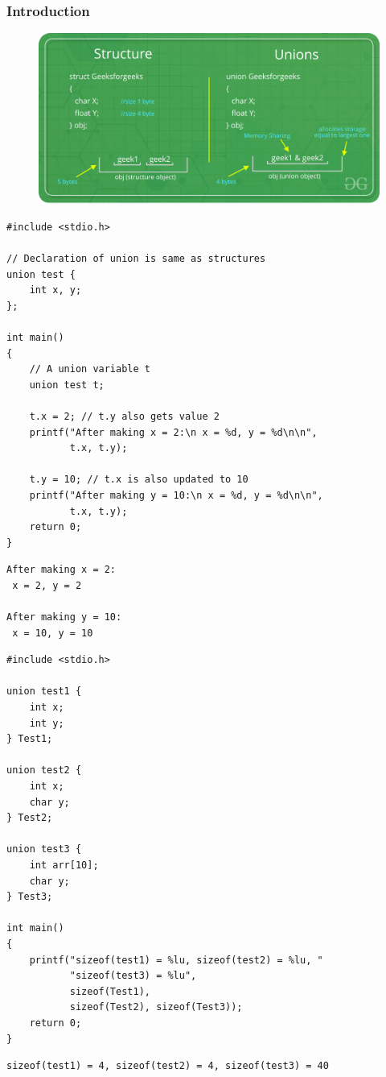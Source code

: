 \documentclass{../c-lecture}
\begin{document}
\begin{frame}
  \frametitle{Introduction}
  \begin{figure}
  \includegraphics[width=\textwidth]{./img/union.png}
  \end{figure}
\end{frame}

\begin{frame}[fragile]
  \begin{verbatim}
#include <stdio.h>

// Declaration of union is same as structures
union test {
    int x, y;
};

int main()
{
    // A union variable t
    union test t;

    t.x = 2; // t.y also gets value 2
    printf("After making x = 2:\n x = %d, y = %d\n\n",
           t.x, t.y);

    t.y = 10; // t.x is also updated to 10
    printf("After making y = 10:\n x = %d, y = %d\n\n",
           t.x, t.y);
    return 0;
}
  \end{verbatim}
  \begin{verbatim}
After making x = 2:
 x = 2, y = 2

After making y = 10:
 x = 10, y = 10
  \end{verbatim}
\end{frame}

\begin{frame}[fragile]
  \begin{verbatim}
#include <stdio.h>

union test1 {
    int x;
    int y;
} Test1;

union test2 {
    int x;
    char y;
} Test2;

union test3 {
    int arr[10];
    char y;
} Test3;

int main()
{
    printf("sizeof(test1) = %lu, sizeof(test2) = %lu, "
           "sizeof(test3) = %lu",
           sizeof(Test1),
           sizeof(Test2), sizeof(Test3));
    return 0;
}
  \end{verbatim}

  \begin{verbatim}
sizeof(test1) = 4, sizeof(test2) = 4, sizeof(test3) = 40
  \end{verbatim}
\end{frame}
\end{document}
